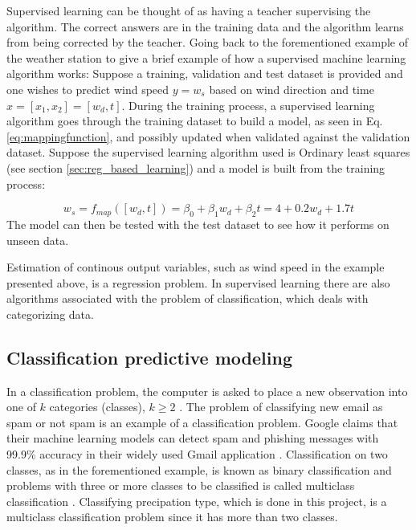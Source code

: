	Supervised learning can be thought of as having a teacher supervising the algorithm. The correct answers are in the training data and the algorithm learns from being corrected by the teacher. Going back to the forementioned example of the weather station to give a brief example of how a supervised machine learning algorithm works: Suppose a training, validation and test dataset is provided and one wishes to predict wind speed $y = w_s$ based on wind direction and time $x = [x_1, x_2] = [w_d, t]$. During the training process, a supervised learning algorithm goes through the training dataset to build a model, as seen in Eq. \ref{eq:mappingfunction}, and possibly updated when validated against the validation dataset. Suppose the supervised learning algorithm used is Ordinary least squares (see section \ref{sec:reg_based_learning}) and a model is built from the training process: 

\begin{equation} \label{eq:example_ws}
	w_s = f_{map}([w_d, t]) = \beta_0 + \beta_1 w_d + \beta_2 t = 4 + 0.2w_d + 1.7t
\end{equation}
	The model can then be tested with the test dataset to see how it performs on unseen data.  %

	Estimation of continous output variables, such as wind speed in the example presented above, is a regression problem. In supervised learning there are also algorithms associated with the problem of classification, which deals with categorizing data.


	\subsection{Classification predictive modeling} \label{sec:classification}
	In a classification problem, the computer is asked to place a new observation into one of $k$ categories (classes), $k \geq 2$ \cite{BOOK:1}. The problem of classifying new email as spam or not spam is an example of a classification problem. Google claims that their machine learning models can detect spam and phishing messages with 99.9\% accuracy in their widely used Gmail application \cite{WEBSITE:4}. Classification on two classes, as in the forementioned example, is known as binary classification and problems with three or more classes to be classified is called multiclass classification \cite{MISC:1}. Classifying precipation type, which is done in this project, is a multiclass classification problem since it has more than two classes.

